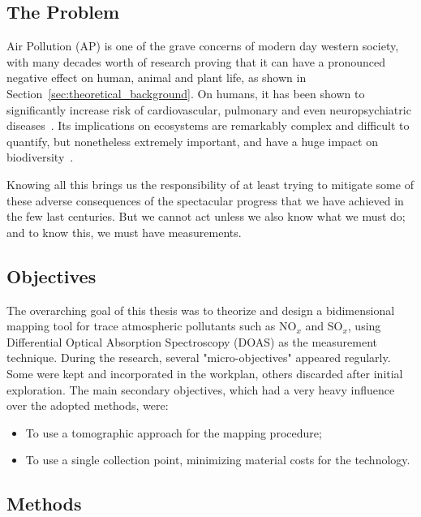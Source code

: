 \subsection{The Problem}%
\label{sub:the_problem}

Air Pollution (\gls{AP}) is one of the grave concerns of modern day
western society, with many decades worth of research proving that it can
have a pronounced negative effect on human, animal and plant life, as
shown in Section~\ref{sec:theoretical_background}. On humans, it has
been shown to significantly increase risk of cardiovascular, pulmonary
and even neuropsychiatric diseases~\cite{Carugno2016, Ghorani-Azam2016,
Kampa2008}. Its implications on ecosystems are remarkably complex and
difficult to quantify, but nonetheless extremely important, and have a
huge impact on biodiversity~\cite{Lovett2009}.

Knowing all this brings us the responsibility of at least trying to
mitigate some of these adverse consequences of the spectacular progress
that we have achieved in the few last centuries. But we cannot act
unless we also know what we must do; and to know this, we must have
measurements.

\subsection{Objectives}%
\label{sub:objectives}

The overarching goal of this thesis was to theorize and design a
bidimensional mapping tool for trace atmospheric pollutants such as
NO$_x$ and SO$_x$, using Differential Optical Absorption Spectroscopy
(\gls{DOAS}) as the measurement technique. During the research, several
"micro-objectives" appeared regularly. Some were kept and incorporated
in the workplan, others discarded after initial exploration. The main
secondary objectives, which had a very heavy influence over the adopted
methods, were:
\begin{itemize}
    \item To use a tomographic approach for the mapping procedure;
    \item To use a single collection point, minimizing material costs
        for the technology.
\end{itemize}


\subsection{Methods}%
\label{sub:methods}

